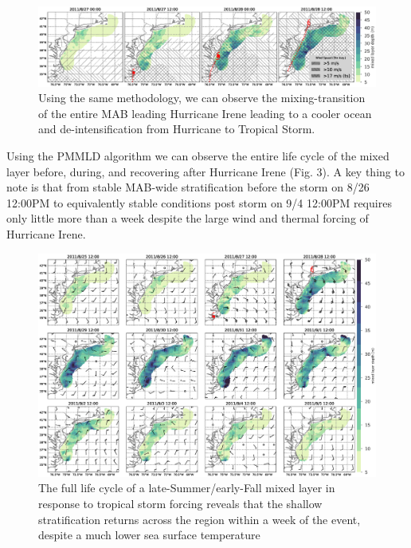 \documentclass{article}
\begin{document}
\begin{figure}[h]
\caption{Using the same methodology, we can observe the mixing-transition of the entire MAB leading Hurricane Irene leading to a cooler ocean and de-intensification from Hurricane to Tropical Storm.}
\centering
\includegraphics[width=1.0\textwidth]{irene_4panel.eps}
\end{figure}


Using the PMMLD algorithm we can observe the entire life cycle of the mixed layer before, during, and recovering after Hurricane Irene (Fig. 3). 
A key thing to note is that from stable MAB-wide stratification before the storm on 8/26 12:00PM to equivalently stable conditions post storm on 9/4 12:00PM requires only little more than a week despite the large wind and thermal forcing of Hurricane Irene.
\begin{figure}[h]
\caption{The full life cycle of a late-Summer/early-Fall mixed layer in response to tropical storm forcing reveals that the shallow stratification returns across the region within a week of the event, despite a much lower sea surface temperature}
\centering
\includegraphics[width=1.0\textwidth]{irene_barbs_4koma.eps}
\end{figure}
\end{document}

